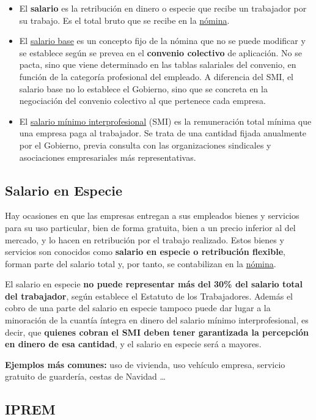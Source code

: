 \documentclass{article}
\begin{document}
	\begin{itemize}
		\item El \textbf{salario} es la retribución en dinero o especie que recibe un trabajador por su trabajo. Es el total bruto que se recibe en la \underline{nómina}.
		\item El \underline{salario base} es un concepto fijo de la nómina que no se puede modificar y se establece según se prevea en el \textbf{convenio colectivo} de aplicación. No se pacta, sino que viene determinado en las tablas salariales del convenio, en función de la categoría profesional del empleado. A diferencia del SMI, el salario base no lo establece el Gobierno, sino que se concreta en la negociación del convenio colectivo al que pertenece cada empresa.
		\item El \underline{salario mínimo interprofesional} (SMI) es la remuneración total mínima que una empresa paga al trabajador. Se trata de una cantidad fijada anualmente por el Gobierno, previa consulta con las organizaciones sindicales y asociaciones empresariales más representativas.
	\end{itemize}
	
	\subsection*{Salario en Especie}
	
	Hay ocasiones en que las empresas entregan a sus empleados bienes y servicios para su uso particular, bien de forma gratuita, bien a un precio inferior al del mercado, y lo hacen en retribución por el trabajo realizado. Estos bienes y servicios son conocidos como \textbf{salario en especie o retribución flexible}, forman parte del salario total y, por tanto, se contabilizan en la \underline{nómina}.
	
	El salario en especie \textbf{no puede representar más del 30\% del salario total del trabajador}, según establece el Estatuto de los Trabajadores. Además el cobro de una parte del salario en especie tampoco puede dar lugar a la minoración de la cuantía íntegra en dinero del salario mínimo interprofesional, es decir, que \textbf{quienes cobran el SMI deben tener garantizada la percepción en dinero de esa cantidad}, y el salario en especie será a mayores.
	
	\textbf{Ejemplos más comunes:} uso de vivienda, uso vehículo empresa, servicio gratuito de guardería, cestas de Navidad …
	
	\subsection*{IPREM}
	
\end{document}
